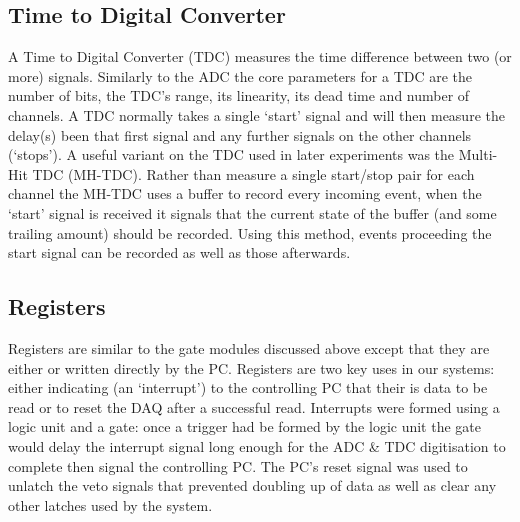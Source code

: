 \subsection{Time to Digital Converter} %
\label{ssub:time_to_digital_converter}
A Time to Digital Converter (TDC) measures the time difference between two (or more) signals. Similarly to the ADC the core parameters for a TDC are the number of bits, the TDC's range, its linearity, its dead time and number of channels. A TDC normally takes a single `start' signal and will then measure the delay(s) been that first signal and any further signals on the other channels (`stops'). A useful variant on the TDC used in later experiments was the Multi-Hit TDC (MH-TDC). Rather than measure a single start/stop pair for each channel the MH-TDC uses a buffer to record every incoming event, when the `start' signal is received it signals that the current state of the buffer (and some trailing amount) should be recorded. Using this method, events proceeding the start signal can be recorded as well as those afterwards.

\subsection{Registers} %
\label{ssub:registers}
Registers are similar to the gate modules discussed above except that they are either or written directly by the PC. Registers are two key uses in our systems: either indicating (an `interrupt') to the controlling PC that their is data to be read or to reset the DAQ after a successful read. Interrupts were formed using a logic unit and a gate: once a trigger had be formed by the logic unit the gate would delay the interrupt signal long enough for the ADC & TDC digitisation to complete then signal the controlling PC. The PC's reset signal was used to unlatch the veto signals that prevented doubling up of data as well as clear any other latches used by the system.


